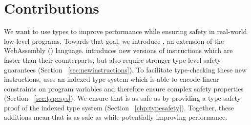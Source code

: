 
\section{Contributions}
We want to use types to improve performance while ensuring safety in real-world low-level programs.
Towards that goal, we introduce \name, an extension of the WebAssembly (\wasm) language.
\name introduces new versions of \wasm instructions which are faster than their \wasm counterparts, but also require stronger type-level safety guarantees (Section ~\ref{sec:newinstructions}).
To facilitate type-checking these new instructions, \name uses an indexed type system which is able to encode linear constraints on program variables and therefore ensure complex safety properties (Section ~\ref{sec:typesys}).
We ensure that \name is as safe as \wasm by providing a type safety proof of the \name indexed type system (Section ~\ref{chp:typesafety}).
Together, these additions mean that \name is as safe as \wasm while potentially improving performance.
